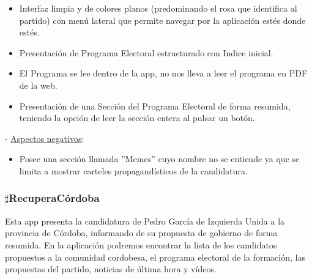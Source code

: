 \begin{itemize}
	\item Interfaz limpia y de colores planos (predominando el rosa que identifica al partido) con menú lateral que permite navegar por la aplicación estés donde estés.
	\item Presentación de Programa Electoral estructurado con Indice inicial.
	\item El Programa se lee dentro de la app, no nos lleva a leer el programa en PDF de la web. 
	\item Presentación de una Sección del Programa Electoral de forma resumida, teniendo la opción de leer la sección entera al pulsar un botón.
\end{itemize}

 - \underline{Aspectos negativos}:

\begin{itemize}
	\item Posee una sección llamada ''Memes'' cuyo nombre no se entiende ya que se limita a mostrar carteles propagandísticos de la candidatura. 
\end{itemize}

\subsubsection{$\sharp$RecuperaCórdoba}
Esta app presenta la candidatura de Pedro García de Izquierda Unida a la provincia de Córdoba, informando de su propuesta de gobierno de forma resumida. En la aplicación podremos encontrar la lista de los candidatos propuestos a la comunidad cordobesa, el programa electoral de la formación, las propuestas del partido, noticias de última hora y vídeos.

